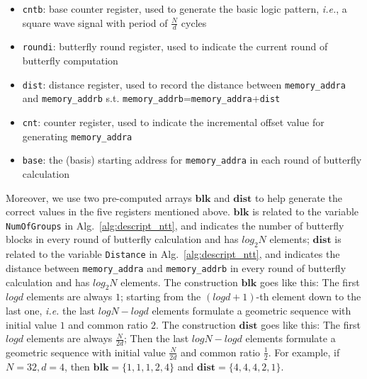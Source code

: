 \documentclass{iacrtrans}
\theoremstyle{plain}
\begin{document}
\begin{itemize}
    \item \texttt{cntb}: base counter register, used to generate the basic logic pattern, \textit{i.e.}, a square wave signal with period of $\frac{N}{d}$ cycles
    \item \texttt{roundi}: butterfly round register, used to indicate the current round of butterfly computation
    \item \texttt{dist}: distance register, used to record the distance between \texttt{memory\_addra} and \texttt{memory\_addrb} s.t. \texttt{memory\_addrb}=\texttt{memory\_addra}+\texttt{dist}
    \item \texttt{cnt}: counter register, used to indicate the incremental offset value for generating \texttt{memory\_addra}
    \item \texttt{base}: the (basis) starting address for \texttt{memory\_addra} in each round of butterfly calculation
\end{itemize}

Moreover, we use two pre-computed arrays $\mathbf{blk}$ and $\mathbf{dist}$ to help generate the correct values in the five registers mentioned above. $\mathbf{blk}$ is related to the variable \texttt{NumOfGroups} in Alg.~\ref{alg:descript_ntt}, and indicates the number of butterfly blocks in every round of butterfly calculation and has $log_2N$ elements; $\mathbf{dist}$ is related to the variable \texttt{Distance} in Alg.~\ref{alg:descript_ntt}, and indicates the distance between \texttt{memory\_addra} and \texttt{memory\_addrb} in every round of butterfly calculation and has $log_2N$ elements. The construction $\mathbf{blk}$ goes like this: The first $logd$ elements are always $1$; starting from the $(logd+1)$-th element down to the last one, \textit{i.e.} the last $logN-logd$ elements formulate a geometric sequence with initial value $1$ and common ratio $2$. The construction $\mathbf{dist}$ goes like this: The first $logd$ elements are always $\frac{N}{2d}$; Then the last $logN-logd$ elements formulate a geometric sequence with initial value $\frac{N}{2d}$ and common ratio $\frac{1}{2}$.
For example, if $N=32, d=4$, then $\mathbf{blk}=\{1,1,1,2,4\}$ and $\mathbf{dist}=\{4,4,4,2,1\}$.
\end{document}
